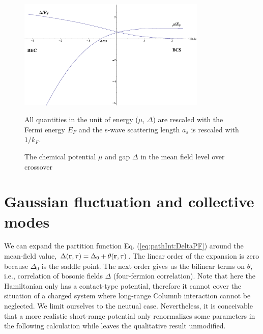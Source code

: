 \begin{figure}[htbp]
\begin{center}
\includegraphics[width=0.8\textwidth]{SingleChannelCrossoverMuDelta}
\caption{The chemical potential $\mu$ and gap $\Delta$ in the mean field level over crossover} 
\label{fig:pathInt:meanField}
{\small All quantities in the unit of energy ($\mu$, $\Delta$) are rescaled with the Fermi energy $E_{F}$ and the s-wave scattering length $a_{s}$ is rescaled with $1/k_{F}$.  }
\end{center}
\end{figure}



\section{Gaussian fluctuation and collective modes}\label{sec:collective1}
We can expand the partition function Eq. (\ref{eq:pathInt:DeltaPF}) around the mean-field value, $\Delta(\mathbf{r},\tau)=\Delta_{0}+\theta(\mathbf{r},\tau)$. The linear order of the  expansion is zero because $\Delta_{0}$ is the saddle point.  The next order gives us the bilinear terms on $\theta$, i.e., correlation of bosonic fields $\Delta$ (four-fermion correlation).  Note that here the Hamiltonian only has a contact-type potential, therefore it cannot cover the situation of a charged system where long-range Columnb interaction cannot be neglected.  We limit ourselves to the neutual case.  Nevertheless, it is conceivable that a more realistic short-range potential only renormalizes some parameters in the following calculation while leaves the qualitative result unmodified.  

